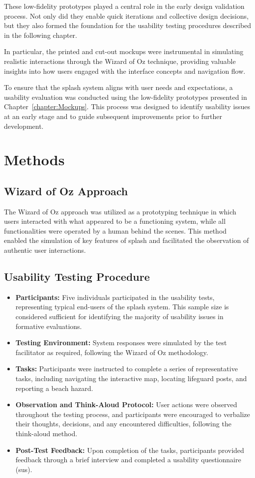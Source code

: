 These low-fidelity prototypes played a central role in the early design validation process. Not only did they enable quick iterations and collective design decisions, but they also formed the foundation for the usability testing procedures described in the following chapter.

\noindent In particular, the printed and cut-out mockups were instrumental in simulating realistic interactions through the Wizard of Oz technique, providing valuable insights into how users engaged with the interface concepts and navigation flow.

To ensure that the \ac{splash} system aligns with user needs and expectations, a usability evaluation was conducted using the low-fidelity prototypes presented in Chapter~\ref{chapter:Mockups}. This process was designed to identify usability issues at an early stage and to guide subsequent improvements prior to further development.

\section{Methods}

\subsection{Wizard of Oz Approach}
The Wizard of Oz approach was utilized as a prototyping technique in which users interacted with what appeared to be a functioning system, while all functionalities were operated by a human behind the scenes. This method enabled the simulation of key features of \ac{splash} and facilitated the observation of authentic user interactions.

\subsection{Usability Testing Procedure}
\begin{itemize}
    \item \textbf{Participants:} Five individuals participated in the usability tests, representing typical end-users of the \ac{splash} system. This sample size is considered sufficient for identifying the majority of usability issues in formative evaluations.
    \item \textbf{Testing Environment:} System responses were simulated by the test facilitator as required, following the Wizard of Oz methodology.
    \item \textbf{Tasks:} Participants were instructed to complete a series of representative tasks, including navigating the interactive map, locating lifeguard posts, and reporting a beach hazard.
    \item \textbf{Observation and Think-Aloud Protocol:} User actions were observed throughout the testing process, and participants were encouraged to verbalize their thoughts, decisions, and any encountered difficulties, following the think-aloud method.
    \item \textbf{Post-Test Feedback:} Upon completion of the tasks, participants provided feedback through a brief interview and completed a usability questionnaire (\ac{sus}).
\end{itemize}

